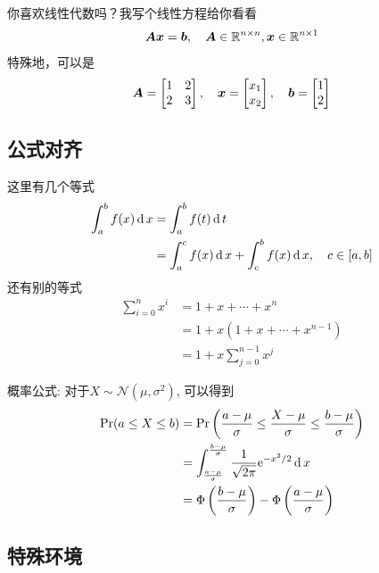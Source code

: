 你喜欢线性代数吗？我写个线性方程给你看看
\begin{equation}
\bm{A} \bm{x}= \bm{b}, \quad \bm{A}\in \mathbb{R}^{{n}\times {n}}, \bm{x}\in \mathbb{R}^{{n}\times {1}}
\end{equation}
特殊地，可以是
\begin{equation}
\bm{A} = \begin{bmatrix}
1 & 2 \\
2 & 3 
\end{bmatrix},\quad
\bm{x}=\begin{bmatrix}
x_1 \\ x_2
\end{bmatrix}, \quad
\bm{b} =\begin{bmatrix}
1 \\ 2
\end{bmatrix}
\end{equation}

\subsection{公式对齐}

这里有几个等式
\begin{equation}
\begin{split}
\int^b_a f(x)\operatorname{\mathrm{d}} x 
& = \int^b_a f(t)\operatorname{\mathrm{d}} t \\
& = \int^c_a f(x)\operatorname{\mathrm{d}} x + \int^b_c f(x)\operatorname{\mathrm{d}} x, \quad c\in [a,b] 
\end{split}
\end{equation}
还有别的等式
\begin{align}
\sum^n_{i=0} x^i 
&= 1 + x + \cdots + x^n \\
&= 1 + x(1 + x + \cdots + x^{n-1}) \\
& = 1 + x \sum^{n-1}_{j=0} x^j
\end{align}

概率公式: 对于$X\sim \mathcal{N}(\mu, \sigma^2)$, 可以得到
\begin{align}
\operatorname{\mathrm{Pr}}(a \le X \le b) 
&=\operatorname{\mathrm{Pr}}\left(\frac{a-\mu}{\sigma}\le \frac{X-\mu}{\sigma}\le
  \frac{b-\mu}{\sigma} \right) \\
&= \int^{\frac{b-\mu}{\sigma}}_{\frac{a-\mu}{\sigma}} \frac{1}{\sqrt{2\pi}}\mathrm{e}^{-x^2/2}\operatorname{\mathrm{d}} x \\
& = \Phi\left(\frac{b-\mu}{\sigma}\right) - \Phi\left(\frac{a-\mu}{\sigma}\right) 
\end{align}


\subsection{特殊环境}


